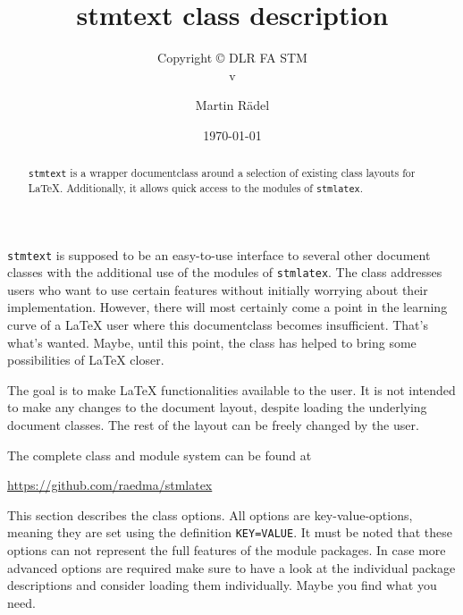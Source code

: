 \documentclass[%
  type=article,%
  layout=koma,%
  page=false,%
  hyperref=true,%
  cleveref=true,%
  conditionallox=true,%
  conditionalloxnewpage=true,%
  date=true,%
  glossaries=true,%
  index=true,%
  listings=true%
]{stmtext}
\author{Martin R\"{a}del}
\title{stmtext class description}
\subtitle{Copyright \copyright{} \the\year{} DLR FA STM\\v\formatdate[versiondatestyle]{\DTMToday}}
\date{\today}
\begin{document}
\maketitle

\begin{abstract}
\texttt{stmtext} is a wrapper documentclass around a selection of existing class layouts for \LaTeX. Additionally, it allows quick access to the modules of \texttt{stmlatex}.
\end{abstract}

\secondpage

\tableofcontents

\conditionallistoffigures  %
\conditionallistoftables   %
\conditionallistoflistings %

\setcounter{currentlevel}{\basetoclevelnr}
\label{sec:about}

\texttt{stmtext} is supposed to be an easy-to-use interface to several other document classes with the additional use of the modules of \texttt{stmlatex}. The class addresses users who want to use certain features without initially worrying about their implementation. However, there will most certainly come a point in the learning curve of a \LaTeX{} user where this documentclass becomes insufficient. That's what's wanted. Maybe, until this point, the class has helped to bring some possibilities of \LaTeX{} closer. 

The goal is to make \LaTeX{} functionalities available to the user. It is not intended to make any changes to the document layout, despite loading the underlying document classes. The rest of the layout can be freely changed by the user.

The complete class and module system can be found at

\href{https://github.com/raedma/stmlatex}{https://github.com/raedma/stmlatex}


\setcounter{currentlevel}{\basetoclevelnr}
\label{sec:options}

This section describes the class options. All options are key-value-options, meaning they are set using the definition \texttt{KEY=VALUE}. It must be noted that these options can not represent the full features of the module packages. In case more advanced options are required make sure to have a look at the individual package descriptions and consider loading them individually. Maybe you find what you need.
\end{document}
